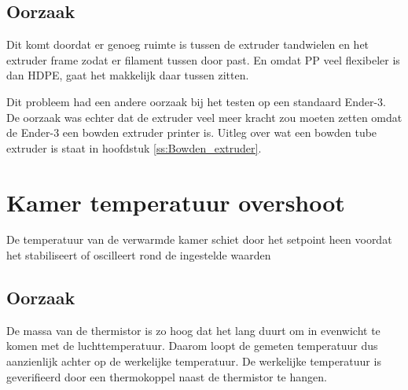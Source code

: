 \subsection{Oorzaak}

Dit komt doordat er genoeg ruimte is tussen de extruder tandwielen en het
extruder frame zodat er filament tussen door past. En omdat PP veel flexibeler is
dan HDPE, gaat het makkelijk daar tussen zitten.

Dit probleem had een andere oorzaak bij het testen op een standaard Ender-3. De
oorzaak was echter dat de extruder veel meer kracht zou moeten zetten omdat de
Ender-3 een bowden extruder printer is. Uitleg over wat een bowden tube
extruder is staat in hoofdstuk \ref{ss:Bowden_extruder}.


\section{Kamer temperatuur overshoot}

De temperatuur van de verwarmde kamer schiet door het setpoint heen voordat het
stabiliseert of oscilleert rond de ingestelde waarden

\subsection{Oorzaak}

De massa van de thermistor is zo hoog dat het lang duurt om in evenwicht te
komen met de luchttemperatuur. Daarom loopt de gemeten temperatuur dus
aanzienlijk achter op de werkelijke temperatuur. De werkelijke temperatuur is
geverifieerd door een thermokoppel naast de thermistor te hangen.
